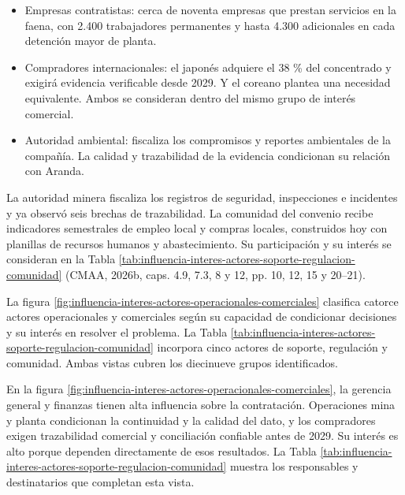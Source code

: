 \documentclass[subdoc]{../../comun/overfore}
\begin{document}
\begin{itemize}
\item Empresas contratistas: cerca de noventa empresas que prestan servicios en la faena, con 2.400 trabajadores permanentes y hasta 4.300 adicionales en cada detención mayor de planta.
\item Compradores internacionales: el japonés adquiere el 38 \% del concentrado y exigirá evidencia verificable desde 2029. Y el coreano plantea una necesidad equivalente. Ambos se consideran dentro del mismo grupo de interés comercial.
\item Autoridad ambiental: fiscaliza los compromisos y reportes ambientales de la compañía. La calidad y trazabilidad de la evidencia condicionan su relación con Aranda.
\end{itemize}
La autoridad minera fiscaliza los registros de seguridad, inspecciones e incidentes y ya observó seis brechas de trazabilidad. La comunidad del convenio recibe indicadores semestrales de empleo local y compras locales, construidos hoy con planillas de recursos humanos y abastecimiento. Su participación y su interés se consideran en la Tabla \ref{tab:influencia-interes-actores-soporte-regulacion-comunidad} (CMAA, 2026b, caps. 4.9, 7.3, 8 y 12, pp. 10, 12, 15 y 20–21).

La figura \ref{fig:influencia-interes-actores-operacionales-comerciales} clasifica catorce actores operacionales y comerciales según su capacidad de condicionar decisiones y su interés en resolver el problema. La Tabla \ref{tab:influencia-interes-actores-soporte-regulacion-comunidad} incorpora cinco actores de soporte, regulación y comunidad. Ambas vistas cubren los diecinueve grupos identificados.

En la figura \ref{fig:influencia-interes-actores-operacionales-comerciales}, la gerencia general y finanzas tienen alta influencia sobre la contratación. Operaciones mina y planta condicionan la continuidad y la calidad del dato, y los compradores exigen trazabilidad comercial y conciliación confiable antes de 2029. Su interés es alto porque dependen directamente de esos resultados. La Tabla \ref{tab:influencia-interes-actores-soporte-regulacion-comunidad} muestra los responsables y destinatarios que completan esta vista.
\end{document}
